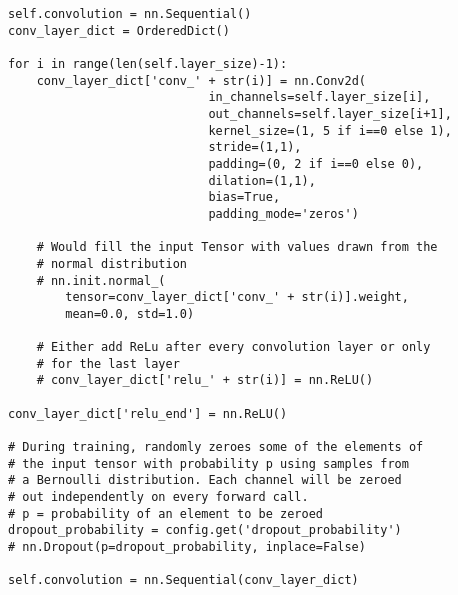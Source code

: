 \begin{verbatim}
self.convolution = nn.Sequential()
conv_layer_dict = OrderedDict()

for i in range(len(self.layer_size)-1):
    conv_layer_dict['conv_' + str(i)] = nn.Conv2d(
                            in_channels=self.layer_size[i], 
                            out_channels=self.layer_size[i+1],
                            kernel_size=(1, 5 if i==0 else 1), 
                            stride=(1,1),
                            padding=(0, 2 if i==0 else 0),
                            dilation=(1,1),
                            bias=True,
                            padding_mode='zeros')
                                                    
    # Would fill the input Tensor with values drawn from the 
    # normal distribution
    # nn.init.normal_(
        tensor=conv_layer_dict['conv_' + str(i)].weight, 
        mean=0.0, std=1.0)

    # Either add ReLu after every convolution layer or only 
    # for the last layer
    # conv_layer_dict['relu_' + str(i)] = nn.ReLU()

conv_layer_dict['relu_end'] = nn.ReLU()

# During training, randomly zeroes some of the elements of 
# the input tensor with probability p using samples from 
# a Bernoulli distribution. Each channel will be zeroed 
# out independently on every forward call. 
# p = probability of an element to be zeroed
dropout_probability = config.get('dropout_probability')
# nn.Dropout(p=dropout_probability, inplace=False) 

self.convolution = nn.Sequential(conv_layer_dict)
\end{verbatim}

